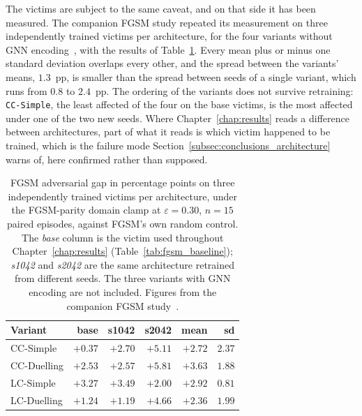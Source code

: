 The victims are subject to the same caveat, and on that side it has been measured. The
companion FGSM study repeated its measurement on three independently trained victims per
architecture, for the four variants without GNN
encoding~\cite{martins2026fgsm}, with the results of
Table~\ref{tab:victim_replication}. Every mean plus or minus one standard deviation
overlaps every other, and the spread between the variants' means, $1.3$~pp, is smaller
than the spread between seeds of a single variant, which runs from $0.8$ to $2.4$~pp.
The ordering of the variants does not survive retraining: \texttt{CC-Simple}, the least
affected of the four on the base victims, is the most affected under one of the two
new seeds. Where Chapter~\ref{chap:results} reads a difference between architectures,
part of what it reads is which victim happened to be trained, which is the failure mode
Section~\ref{subsec:conclusions_architecture} warns of, here confirmed rather than
supposed.

\begin{table}[htbp]
  \centering
  \caption[FGSM gap across independently trained victims]{FGSM adversarial gap in
           percentage points on three independently trained victims per architecture,
           under the FGSM-parity domain clamp at $\varepsilon = 0.30$, $n = 15$ paired
           episodes, against FGSM's own random control. The \emph{base} column is
           the victim used throughout Chapter~\ref{chap:results}
           (Table~\ref{tab:fgsm_baseline}); \emph{s1042} and \emph{s2042} are the same
           architecture retrained from different seeds. The three variants with GNN
           encoding are not included. Figures from the companion FGSM
           study~\cite{martins2026fgsm}.}
  \label{tab:victim_replication}
  \begin{tabular}{lrrrrr}
    \hline
    \textbf{Variant} & \textbf{base} & \textbf{s1042} & \textbf{s2042}
                     & \textbf{mean} & \textbf{sd} \\
    \hline
    CC-Simple    & $+0.37$ & $+2.70$ & $+5.11$ & $+2.72$ & $2.37$ \\
    CC-Duelling  & $+2.53$ & $+2.57$ & $+5.81$ & $+3.63$ & $1.88$ \\
    LC-Simple    & $+3.27$ & $+3.49$ & $+2.00$ & $+2.92$ & $0.81$ \\
    LC-Duelling  & $+1.24$ & $+1.19$ & $+4.66$ & $+2.36$ & $1.99$ \\
    \hline
  \end{tabular}
\end{table}

